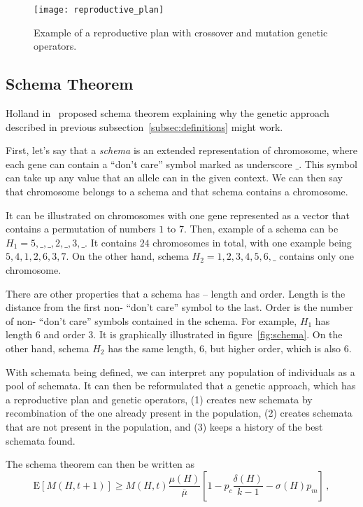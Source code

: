 \begin{figure}[h]
    \texttt{[image: reproductive\_plan]}
    \caption[Example of a reproductive plan]{Example of a reproductive plan with crossover and mutation genetic operators.}
    \label{fig:reproductive-plan}
\end{figure}

\subsection{Schema Theorem}\label{subsec:schema-theorem}

Holland in~\cite{hollandAdaptationNaturalArtificial1975} proposed
schema theorem explaining why the genetic approach described in
previous subsection~\ref{subsec:definitions} might work.

First, let’s say that a \textit{schema} is an extended representation of chromosome,
where each gene can contain a “don’t care” symbol marked as underscore $\_$.
This symbol can take up any value that an allele can in the given context.
We can then say that chromosome belongs to a schema
and that schema contains a chromosome.

It can be illustrated on chromosomes with one gene represented as
a vector that contains a permutation of numbers $1$ to $7$.
Then, example of a schema can be $H_1 = 5, \_, \_, 2, \_, 3, \_$.
It contains $24$ chromosomes in total, with one example being $5, 4, 1, 2, 6, 3, 7$.
On the other hand, schema $H_2 = 1, 2, 3, 4, 5, 6, \_$ contains only one chromosome.

There are other properties that a schema has – length and order.
Length is the distance from the first non- “don’t care” symbol to the last.
Order is the number of non- “don’t care” symbols contained in the schema.
For example, $H_1$ has length $6$ and order $3$.
It is graphically illustrated in figure~\ref{fig:schema}.
On the other hand, schema $H_2$ has the same length, $6$, but higher order, which is also $6$.

With schemata being defined, we can interpret any population of individuals as a pool of schemata.
It can then be reformulated that a genetic approach, which has a reproductive plan and
genetic operators, (1) creates new schemata by recombination of the one already present in the population,
(2) creates schemata that are not present in the population, and (3) keeps a history of the best schemata found.

The schema theorem can then be written as
\begin{equation}
    \mathrm{E}[M(H, t+1)] \geq M(H, t) \dfrac{\mu(H)}{\overline{\mu}}\left[ 1 - p_c \dfrac{\delta(H)}{k-1} - \sigma(H)
    p_m \right]\,,
    \label{eq:schema-theorem}
\end{equation}

